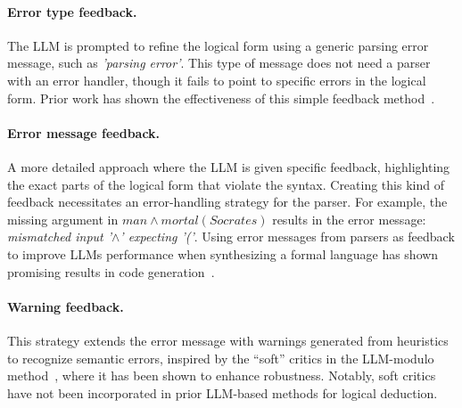 \paragraph{Error type feedback.} The \ac{LLM} is prompted to refine the logical form using a generic parsing error message, such as \emph{'parsing error'}. This type of message does not need a parser with an error handler, though it fails to point to specific errors in the logical form. 
Prior work has shown the effectiveness of this simple feedback method~\cite{liangming_pan_logiclm_2023}.
\paragraph{Error message feedback.} A more detailed approach where the \ac{LLM} is given specific feedback, highlighting the exact parts of the logical form that violate the syntax. Creating this kind of feedback necessitates an error-handling strategy for the parser. For example, the missing argument in $man \wedge mortal(Socrates)$ results in the error message: \emph{mismatched input '$\wedge$' expecting '('}.
Using error messages from parsers as feedback to improve \acp{LLM} performance when synthesizing a formal language has shown promising results in code generation~\cite{zhang-etal-2023-self,jiang-etal-2024-leanreasoner}.
\paragraph{Warning feedback.} This strategy extends the error message with warnings generated from heuristics to recognize semantic errors, inspired by the ``soft'' critics in the LLM-modulo method~\cite{kambhampati2024llms}, where it has been shown to enhance robustness. Notably, soft critics have not been incorporated in prior \ac{LLM}-based methods for logical deduction.